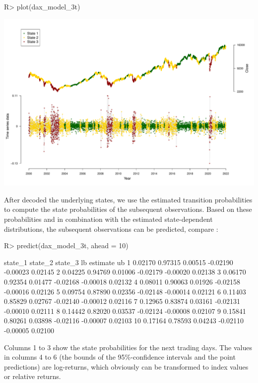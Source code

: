 \documentclass[article]{jss}
\begin{document}
%
\begin{Schunk}
\begin{Sinput}
R> plot(dax_model_3t)
\end{Sinput}
\end{Schunk}
\includegraphics{fhmm_oelschlaeger_adam_michels-dax-dec-ts}
%

After decoded the underlying states, we use the estimated transition probabilities to compute the state probabilities of the subsequent observations. Based on these probabilities and in combination with the estimated state-dependent distributions, the subsequent observations can be predicted, compare \cite{zuc16}:

%
\begin{Schunk}
\begin{Sinput}
R> predict(dax_model_3t, ahead = 10)
\end{Sinput}
\begin{Soutput}
   state_1 state_2 state_3       lb estimate      ub
1  0.02170 0.97315 0.00515 -0.02190 -0.00023 0.02145
2  0.04225 0.94769 0.01006 -0.02179 -0.00020 0.02138
3  0.06170 0.92354 0.01477 -0.02168 -0.00018 0.02132
4  0.08011 0.90063 0.01926 -0.02158 -0.00016 0.02126
5  0.09754 0.87890 0.02356 -0.02148 -0.00014 0.02121
6  0.11403 0.85829 0.02767 -0.02140 -0.00012 0.02116
7  0.12965 0.83874 0.03161 -0.02131 -0.00010 0.02111
8  0.14442 0.82020 0.03537 -0.02124 -0.00008 0.02107
9  0.15841 0.80261 0.03898 -0.02116 -0.00007 0.02103
10 0.17164 0.78593 0.04243 -0.02110 -0.00005 0.02100
\end{Soutput}
\end{Schunk}
%

Columns 1 to 3 show the state probabilities for the next  trading days. The values in columns 4 to 6 (the bounds of the 95\%-confidence intervals and the point predictions) are log-returns, which obviously can be transformed to index values or relative returns.
\end{document}
